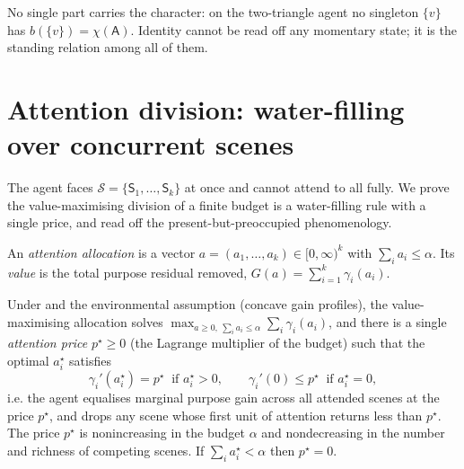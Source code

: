 \documentclass[11pt,twocolumn,a4paper]{article}
\newcommand{\Agent}{\mathsf{A}}
\newcommand{\Char}{\chi}             %
\newcommand{\att}{\alpha}            %
\newcommand{\price}{p^{\star}}       %
\newcommand{\Scene}{\mathsf{S}}      %
\newcommand{\scenes}{\mathcal{S}}    %
\newcommand{\alloc}{a}               %
\begin{document}
\begin{corollary}
\label{cor:not-a-state}
No single part carries the character: on the two-triangle agent no
singleton $\{v\}$ has $b(\{v\})=\Char(\Agent)$. Identity cannot be read
off any momentary state; it is the standing relation among all of them.
\end{corollary}

\section{Attention division: water-filling over concurrent scenes}
\label{sec:attention}

The agent faces $\scenes=\{\Scene_1,\dots,\Scene_k\}$ at once and cannot
attend to all fully. We prove the value-maximising division of a finite
budget is a water-filling rule with a single price, and read off the
present-but-preoccupied phenomenology.

\begin{definition}
\label{def:alloc}
An \emph{attention allocation} is a vector
$\alloc=(a_1,\dots,a_k)\in[0,\infty)^k$ with $\sum_i a_i\le\att$. Its
\emph{value} is the total purpose residual removed,
$G(\alloc)=\sum_{i=1}^k\gamma_i(a_i)$.
\end{definition}

\begin{theorem}
\label{thm:waterfill}
Under  and the environmental assumption
 (concave gain profiles), the
value-maximising allocation solves $\max_{\alloc\ge0,\ \sum_i a_i\le\att}
\sum_i\gamma_i(a_i)$, and there is a single \emph{attention price}
$\price\ge0$ (the Lagrange multiplier of the budget) such that the
optimal $a_i^\star$ satisfies
\[
\gamma_i'(a_i^\star)=\price\ \text{ if } a_i^\star>0,\qquad
\gamma_i'(0)\le\price\ \text{ if } a_i^\star=0,
\]
i.e. the agent equalises marginal purpose gain across all attended scenes
at the price $\price$, and drops any scene whose first unit of attention
returns less than $\price$. The price $\price$ is nonincreasing in the
budget $\att$ and nondecreasing in the number and richness of competing
scenes. If $\sum_i a_i^\star<\att$ then $\price=0$.
\end{theorem}
\end{document}
